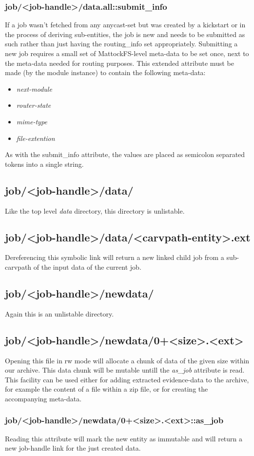 \subsubsection{job/<job-handle>/data.all::submit\_info}
If a job wasn't fetched from any anycast-set but was created by a kickstart or in the process of deriving sub-entities, the job is new and needs to be submitted as such rather than just having the routing\_info set appropriately.  Submitting a new job requires a small set of MattockFS-level meta-data to be set once, next to the meta-data needed for routing purposes. This extended attribute must be made (by the module instance) to contain the following meta-data:
\begin{itemize}
\item \emph{next-module}
\item \emph{router-state}
\item \emph{mime-type}
\item \emph{file-extention}
\end{itemize}
As with the submit\_info attribute, the values are placed as semicolon separated tokens into a single string.
\subsection{job/<job-handle>/data/}
Like the top level \emph{data} directory, this directory is unlistable.
\subsection{job/<job-handle>/data/<carvpath-entity>.ext}
Dereferencing this symbolic link will return a new linked child job from a sub-carvpath of the input data of the current job.
\subsection{job/<job-handle>/newdata/}
Again this is an unlistable directory. 
\subsection{job/<job-handle>/newdata/0+<size>.<ext>}
Opening this file in rw mode will allocate a chunk of data of the given size within our archive. This data chunk will be mutable untill the \emph{as\_job} attribute is read. This facility can be used either for adding extracted evidence-data to the archive, for example the content of a file within a zip file, or for creating the accompanying meta-data.
\subsubsection{job/<job-handle>/newdata/0+<size>.<ext>::as\_job}
Reading this attribute will mark the new entity as immutable and will return a new job-handle link for the just created data.
